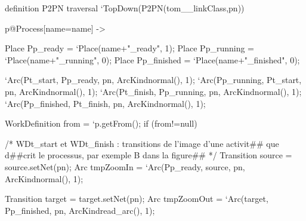 \begin{tomcode3}[caption=\texttt{P2PN :} Code de la définition \emph{ProcessToPetriNet},label=code:p2pn]
definition P2PN traversal `TopDown(P2PN(tom__linkClass,pn)) {
  p@Process[name=name] -> {
    Place Pp_ready    = `Place(name+"_ready", 1);
    Place Pp_running   = `Place(name+"_running", 0);
    Place Pp_finished  = `Place(name+"_finished", 0);
    
    `Arc(Pt_start, Pp_ready, pn, ArcKindnormal(), 1);
    `Arc(Pp_running, Pt_start, pn, ArcKindnormal(), 1);
    `Arc(Pt_finish, Pp_running, pn, ArcKindnormal(), 1);
    `Arc(Pp_finished, Pt_finish, pn, ArcKindnormal(), 1);

    WorkDefinition from = `p.getFrom();
    if (from!=null) {
      /* WDt_start et WDt_finish : transitions de l'image d'une activit## que
      d##crit le processus, par exemple B dans la figure## */
      Transition source = %
      source.setNet(pn);
      Arc tmpZoomIn = `Arc(Pp_ready, source, pn, ArcKindnormal(), 1);

      Transition target = %
      target.setNet(pn);
      Arc tmpZoomOut = `Arc(target, Pp_finished, pn, ArcKindread_arc(), 1);
    }
  }
}
\end{tomcode3}
